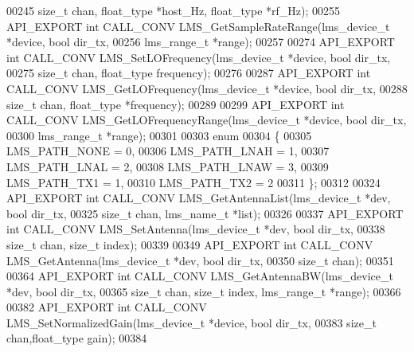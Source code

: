 \begin{DoxyCode}
00245                            \textcolor{keywordtype}{size\_t} chan, float\_type *host_Hz, float\_type *rf_Hz);
00255 API_EXPORT \textcolor{keywordtype}{int} CALL_CONV LMS_GetSampleRateRange(lms\_device\_t *device, \textcolor{keywordtype}{bool} 
      dir_tx,
00256                                                 lms_range_t *range);
00257 
00274 API_EXPORT \textcolor{keywordtype}{int} CALL_CONV LMS_SetLOFrequency(lms\_device\_t *device, \textcolor{keywordtype}{bool} dir_tx,
00275                                             \textcolor{keywordtype}{size\_t} chan, float\_type frequency);
00276 
00287 API_EXPORT \textcolor{keywordtype}{int} CALL_CONV LMS_GetLOFrequency(lms\_device\_t *device, \textcolor{keywordtype}{bool} dir_tx,
00288                                             \textcolor{keywordtype}{size\_t} chan, float\_type *frequency);
00289 
00299 API_EXPORT \textcolor{keywordtype}{int} CALL_CONV LMS_GetLOFrequencyRange(lms\_device\_t *device, \textcolor{keywordtype}{bool} 
      dir_tx,
00300                                                  lms_range_t *range);
00301 
00303 \textcolor{keyword}{enum}
00304 \{
00305     LMS_PATH_NONE = 0, 
00306     LMS_PATH_LNAH = 1, 
00307     LMS_PATH_LNAL = 2, 
00308     LMS_PATH_LNAW = 3, 
00309     LMS_PATH_TX1 = 1,  
00310     LMS_PATH_TX2 = 2   
00311 \};
00312 
00324 API_EXPORT \textcolor{keywordtype}{int} CALL_CONV LMS_GetAntennaList(lms\_device\_t *dev, \textcolor{keywordtype}{bool} dir_tx,
00325                                             \textcolor{keywordtype}{size\_t} chan, lms\_name\_t *list);
00326 
00337 API_EXPORT \textcolor{keywordtype}{int} CALL_CONV LMS_SetAntenna(lms\_device\_t *dev, \textcolor{keywordtype}{bool} dir_tx,
00338                                         \textcolor{keywordtype}{size\_t} chan, \textcolor{keywordtype}{size\_t} index);
00339 
00349 API_EXPORT \textcolor{keywordtype}{int} CALL_CONV LMS_GetAntenna(lms\_device\_t *dev, \textcolor{keywordtype}{bool} dir_tx,
00350                                         \textcolor{keywordtype}{size\_t} chan);
00351 
00364 API_EXPORT \textcolor{keywordtype}{int} CALL_CONV LMS_GetAntennaBW(lms\_device\_t *dev, \textcolor{keywordtype}{bool} dir_tx,
00365                                  \textcolor{keywordtype}{size\_t} chan, \textcolor{keywordtype}{size\_t} index, lms_range_t *range);
00366 
00382 API_EXPORT \textcolor{keywordtype}{int} CALL_CONV LMS_SetNormalizedGain(lms\_device\_t *device, \textcolor{keywordtype}{bool} dir_tx,
00383                                                \textcolor{keywordtype}{size\_t} chan,float\_type gain);
00384 

\end{DoxyCode}
